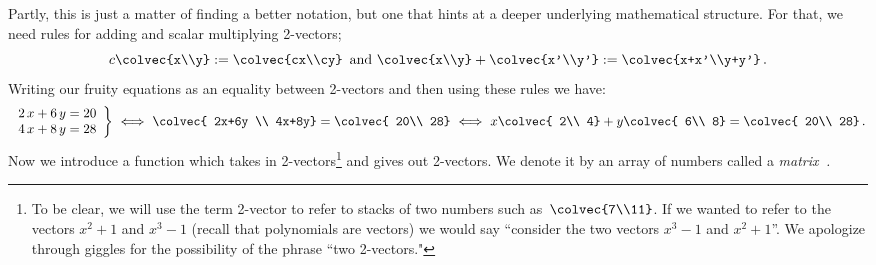 %
Partly, this is just a matter of finding a better notation, but one that hints at a deeper underlying mathematical structure.
For that, we need rules for adding and scalar multiplying 2-vectors; 
\[
c\colvec{x\\y}:=\colvec{cx\\cy}\, \mbox{ and } \colvec{x\\y}+\colvec{x'\\y'}:=\colvec{x+x'\\y+y'}\, .
\]
Writing our fruity equations as an equality between 2-vectors and then using these rules we have:
\begin{equation*}
   \left.
\begin{array}{lr}
   	2\, x + 6\, y  =  20 \\
	4\, x + 8\, y  =  28
     \end{array}
   \right\} 
\ \Longleftrightarrow  \  \colvec{ 2x+6y \\ 4x+8y}  =\colvec{ 20\\ 28}
\ \Longleftrightarrow \ 
   x \colvec{ 2\\ 4} + y \colvec{ 6\\ 8} =\colvec{ 20\\ 28} \, .
\end{equation*}
Now we  introduce a function which takes in 2-vectors\footnote{To be clear, we will use the term 2-vector to refer to stacks of two numbers such as~$\colvec{7\\11}$. If we wanted to refer to the vectors $x^2+1$ and $x^3-1$ (recall that polynomials are vectors) we would say ``consider the two vectors $x^3-1$ and $x^2+1$''. We apologize through giggles for the possibility of the phrase ``two 2-vectors."} and gives out 2-vectors. We denote it by  an array of numbers  called a {\itshape matrix\,\! .}
